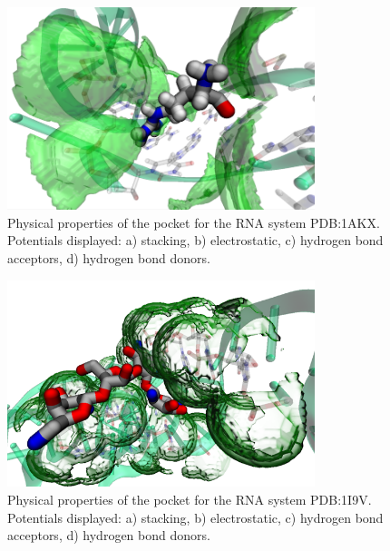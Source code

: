     \begin{figure}[H]
      \centering
      \includegraphics[width=0.8\textwidth]{figures/results/benchmark_rna/1akx.png}
      \caption{\label{fig:benchmark/1akx} Physical properties of the pocket for the RNA system PDB:1AKX. Potentials displayed: a) stacking, b) electrostatic, c) hydrogen bond acceptors, d) hydrogen bond donors.}
    \end{figure}

    \begin{figure}[H]
      \centering
      \includegraphics[width=0.8\textwidth]{figures/results/benchmark_rna/1i9v.png}
      \caption{\label{fig:benchmark/1i9v} Physical properties of the pocket for the RNA system PDB:1I9V. Potentials displayed: a) stacking, b) electrostatic, c) hydrogen bond acceptors, d) hydrogen bond donors.}
    \end{figure}


